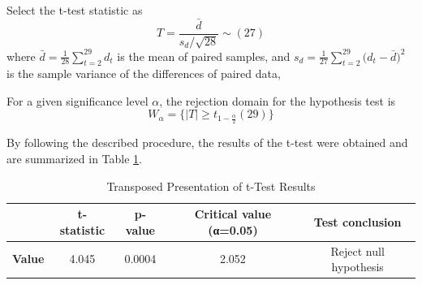 \documentclass{mcmthesis}
\begin{document}
	Select the t-test statistic as
	\begin{equation*}
		T=\frac{ \bar{d} }{ s_d\slash \sqrt{28} } \sim (27)
	\end{equation*}
	where $\bar{d}=\frac{1}{28} \sum_{t=2}^{29} d_t$ is the mean of paired samples, 
	and $ s_d = \frac{1}{27} \sum_{t=2}^{29}\big( d_t - \bar{d} \big)^2 $ is the sample variance of the differences of paired data, 
	
	For a given significance level $\alpha$, the rejection domain for the hypothesis test is
	\begin{equation*}
		W_\alpha = \big\{ |T| \ge t_{1-\frac{\alpha}{2}}(29) \big\}
	\end{equation*}
	
	By following the described procedure, the results of the t-test were obtained and are summarized in Table \ref{1}.


\begin{table}[H]
	\centering
	\caption{Transposed Presentation of t-Test Results}
	\label{table:H_t-test_result_transposed}
	\begin{tabular}{lcccc}
		\toprule
		\rowcolor{red!10}
		& \textbf{t-statistic} & \textbf{p-value} & \textbf{Critical value (α=0.05)} & \textbf{Test conclusion} \\
		\midrule
		\rowcolor{white} %
		\textbf{Value} & 4.045 & 0.0004 & 2.052 & Reject null hypothesis \\
		\bottomrule
	\end{tabular}
	\label{1}
\end{table}
	
\end{document}
